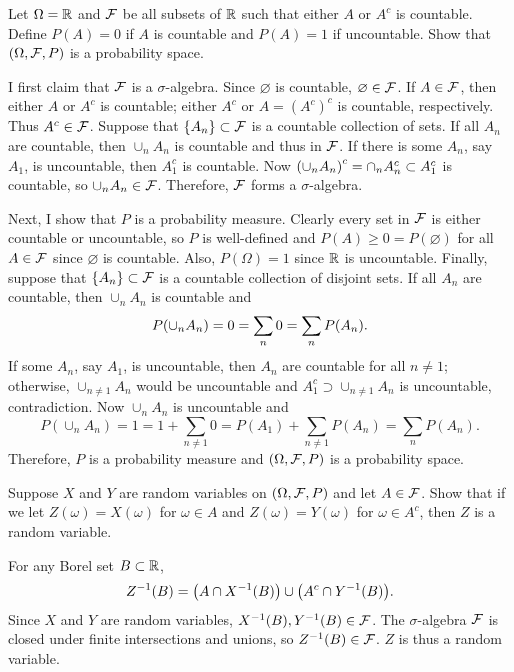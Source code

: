 \documentclass[a4paper, 12pt]{article}
\begin{document}
\begin{exercise}{1.3}
    Let $\Omega = \mathbb{R}$ and $\mathcal{F}$ be all subsets of $\mathbb{R}$ such that
    either $A$ or $A^c$ is countable. Define $P(A) = 0$ if $A$
    is countable and $P(A) = 1$ if uncountable. Show that 
    $(\Omega, \mathcal{F}, P)$ is a probability space.
\end{exercise}
\begin{solution}
    I first claim that $\mathcal{F}$ is a $\sigma$-algebra. Since $\varnothing$ 
    is countable, $\varnothing\in\mathcal{F}$. If $A\in\mathcal{F}$, then either $A$ 
    or $A^c$ is countable; either $A^c$ or $A = (A^c)^c$ is countable, respectively. 
    Thus $A^c\in\mathcal{F}$. Suppose that $\left\{ {A_n} \right\}\subset\mathcal{F}$ is a countable 
    collection of sets. If all $A_n$ are countable, then $\cup_n A_n$ 
    is countable and thus in $\mathcal{F}$. If there is some $A_n$, say $A_1$, 
    is uncountable, then $A_1^c$ is countable. Now 
    $\pth{\cup_n A_n}^c = \cap_n A_n^c\subset A_1^c$ is countable, so 
    $\cup_n A_n\in\mathcal{F}$. Therefore, $\mathcal{F}$ forms a $\sigma$-algebra. 

    Next, I show that $P$ is a probability measure. Clearly every 
    set in $\mathcal{F}$ is either countable or uncountable, so $P$ is 
    well-defined and $P(A)\geq 0 = P(\varnothing)$ for all $A\in\mathcal{F}$ 
    since $\varnothing$ is countable. Also, $P(\Omega) = 1$ since 
    $\mathbb{R}$ is uncountable. Finally, suppose that $\left\{ {A_n} \right\}\subset\mathcal{F}$ 
    is a countable collection of disjoint sets. If all $A_n$ are 
    countable, then $\cup_n A_n$ is countable and 
    \begin{equation*}
        P\pth{\cup_n A_n} = 0 = \sum_n 0 = \sum_n P(A_n).
    \end{equation*}
    If some $A_n$, say $A_1$, is uncountable, then $A_n$ are countable
    for all $n\neq 1$; otherwise, $\cup_{n\neq 1} A_n$ would be uncountable 
    and $A_1^c\supset\cup_{n\neq 1} A_n$ is uncountable, contradiction. Now 
    $\cup_n A_n$ is uncountable and
    \begin{equation*}
        P(\cup_n A_n) = 1 = 1 + \sum_{n\neq 1} 0 = P(A_1) + \sum_{n\neq 1} P(A_n) = \sum_n P(A_n).
    \end{equation*}
    Therefore, $P$ is a probability measure and $(\Omega, \mathcal{F}, P)$ 
    is a probability space.
\end{solution}

\begin{exercise}{1.4}
    Suppose $X$ and $Y$ are random variables on $(\Omega, \mathcal{F}, P)$ and let $A\in\mathcal{F}$. 
    Show that if we let $Z(\omega) = X(\omega)$ for $\omega\in A$ and 
    $Z(\omega) = Y(\omega)$ for $\omega\in A^c$, then $Z$ is a random variable.
\end{exercise}
\begin{solution}
    For any Borel set $B\subset\mathbb{R}$, 
    \begin{equation*}
        Z^{-1}(B) = \pth{A\cap X^{-1}(B)}\cup\pth{A^c\cap Y^{-1}(B)}.
    \end{equation*}
    Since $X$ and $Y$ are random variables, $X^{-1}(B), Y^{-1}(B)\in\mathcal{F}$. 
    The $\sigma$-algebra $\mathcal{F}$ is closed under finite intersections and 
    unions, so $Z^{-1}(B)\in\mathcal{F}$. $Z$ is thus a random variable. 
\end{solution}
\end{document}
